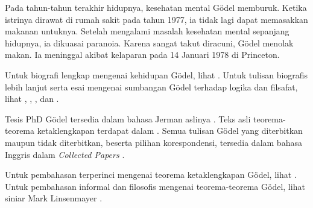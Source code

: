 \documentclass[../../../include/open-logic-section]{subfiles}
\begin{document}
Pada tahun-tahun terakhir hidupnya, kesehatan mental G{\"o}del memburuk.
Ketika istrinya dirawat di rumah sakit pada tahun 1977, ia tidak lagi dapat
memasakkan makanan untuknya. Setelah mengalami masalah kesehatan mental
sepanjang hidupnya, ia dikuasai paranoia. Karena sangat takut diracuni,
G{\"o}del menolak makan. Ia meninggal akibat kelaparan pada 14 Januari 1978
di Princeton.

\begin{reading}
Untuk biografi lengkap mengenai kehidupan G{\"o}del, lihat
\citet{Dawson1997}. Untuk tulisan biografis lebih lanjut serta esai mengenai
sumbangan G{\"o}del terhadap logika dan filsafat, lihat \citet{Wang1990},
\citet{Baaz2011}, \citet{Takeuti2003}, dan \citet{Sigmund2007}.

Tesis PhD G{\"o}del tersedia dalam bahasa Jerman aslinya
\citep{Godel1929}. Teks asli teorema-teorema ketaklengkapan terdapat dalam
\citep{Godel1931}. Semua tulisan G\"odel yang diterbitkan maupun tidak
diterbitkan, beserta pilihan korespondensi, tersedia dalam bahasa Inggris
dalam \emph{Collected Papers} \citet{Godel1986,Godel1990}.

Untuk pembahasan terperinci mengenai teorema ketaklengkapan G{\"o}del, lihat
\citet{Smith2013}. Untuk pembahasan informal dan filosofis mengenai
teorema-teorema G{\"o}del, lihat siniar Mark Linsenmayer
\citep{Linsenmayer2014}.
\end{reading}
\end{document}
